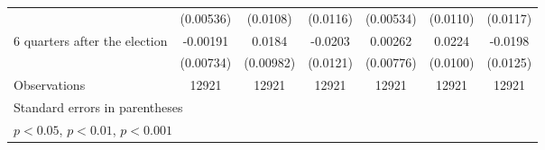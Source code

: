 \begin{table}[!ht]
\begin{tabular}{l*{6}{c}}
                    &   (0.00536)         &    (0.0108)         &    (0.0116)         &   (0.00534)         &    (0.0110)         &    (0.0117)         \\
[1em]
 6 quarters after the election&    -0.00191         &      0.0184         &     -0.0203         &     0.00262         &      0.0224\sym{*}  &     -0.0198         \\
                    &   (0.00734)         &   (0.00982)         &    (0.0121)         &   (0.00776)         &    (0.0100)         &    (0.0125)         \\
\hline
Observations        &       12921         &       12921         &       12921         &       12921         &       12921         &       12921         \\
\hline\hline
\multicolumn{7}{l}{\footnotesize Standard errors in parentheses}\\
\multicolumn{7}{l}{\footnotesize \sym{*} \(p<0.05\), \sym{**} \(p<0.01\), \sym{***} \(p<0.001\)}\\
\end{tabular}
\end{table}
